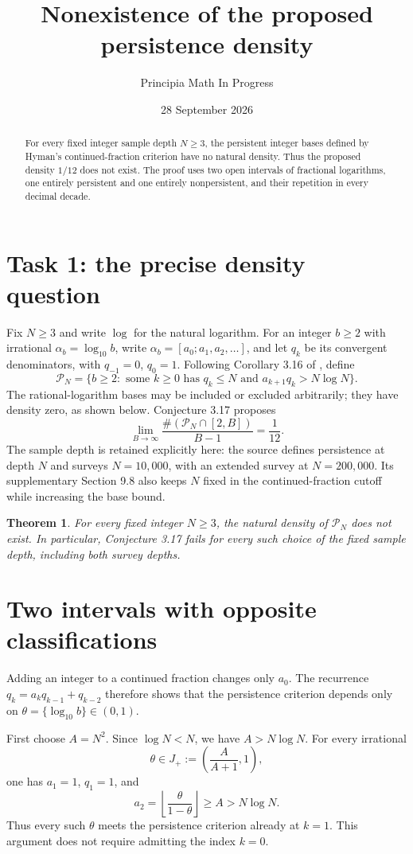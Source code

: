 \documentclass[11pt]{article}
\title{Nonexistence of the proposed persistence density}
\author{Principia Math In Progress}
\date{28 September 2026}
\newtheorem{theorem}{Theorem}
\newcommand{\PN}{\mathcal P_N}
\begin{document}
\maketitle
\begin{abstract}
For every fixed integer sample depth $N\ge3$, the persistent integer
bases defined by Hyman's continued-fraction criterion have no natural
density. Thus the proposed density $1/12$ does not exist. The proof
uses two open intervals of fractional logarithms, one entirely
persistent and one entirely nonpersistent, and their repetition in
every decimal decade.
\end{abstract}

\section*{Task 1: the precise density question}
Fix $N\ge3$ and write $\log$ for the natural logarithm. For an integer
$b\ge2$ with irrational $\alpha_b=\log_{10}b$, write
$\alpha_b=[a_0;a_1,a_2,\ldots]$, and let $q_k$ be its convergent
denominators, with $q_{-1}=0$, $q_0=1$. Following Corollary 3.16
of \cite{H}, define
\[
 \PN=\{b\ge2:\text{ some }k\ge0\text{ has }q_k\le N
                    \text{ and }a_{k+1}q_k>N\log N\}.
\]
The rational-logarithm bases may be included or excluded arbitrarily;
they have density zero, as shown below. Conjecture 3.17 proposes
\[
 \lim_{B\to\infty}\frac{\#(\PN\cap[2,B])}{B-1}=\frac1{12}.
\]
The sample depth is retained explicitly here: the source defines
persistence at depth $N$ and surveys $N=10{,}000$, with an extended
survey at $N=200{,}000$. Its supplementary Section 9.8 also keeps $N$
fixed in the continued-fraction cutoff while increasing the base bound.

\begin{theorem}
For every fixed integer $N\ge3$, the natural density of $\PN$ does not
exist. In particular, Conjecture 3.17 fails for every such choice of
the fixed sample depth, including both survey depths.
\end{theorem}

\section*{Two intervals with opposite classifications}
Adding an integer to a continued fraction changes only $a_0$.
The recurrence $q_k=a_kq_{k-1}+q_{k-2}$ therefore shows that the
persistence criterion depends only on
$\theta=\{\log_{10}b\}\in(0,1)$.

First choose $A=N^2$. Since $\log N<N$, we have $A>N\log N$.
For every irrational
\[
 \theta\in J_+:=\left(\frac{A}{A+1},1\right),
\]
one has $a_1=1$, $q_1=1$, and
\[
 a_2=\left\lfloor\frac{\theta}{1-\theta}\right\rfloor
       \ge A>N\log N.
\]
Thus every such $\theta$ meets the persistence criterion already at
$k=1$. This argument does not require admitting the index $k=0$.
\end{document}
